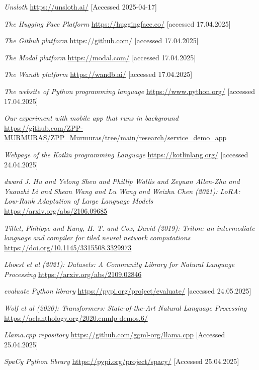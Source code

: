 \documentclass[licencjacka,en]{pracamgr}
\begin{document}
\begin{thebibliography}{99}
\textit{Unsloth}
\url{https://unsloth.ai/}
[Accessed 2025-04-17]

\textit{The Hugging Face Platform}
\url{https://huggingface.co/}
[accessed 17.04.2025]

\textit{The Github platform}
\url{https://github.com/}
[accessed 17.04.2025]

\textit{The Modal platform}
\url{https://modal.com/}
[accessed 17.04.2025]

\textit{The Wandb platform}
\url{https://wandb.ai/}
[accessed 17.04.2025]

\textit{The website of Python programming language}
\url{https://www.python.org/}
[accessed 17.04.2025]

\textit{Our experiment with mobile app that runs in background}
\url{https://github.com/ZPP-MURMURAS/ZPP_Murmuras/tree/main/research/service_demo_app}

\textit{Webpage of the Kotlin programming Language}
\url{https://kotlinlang.org/}
[accessed 24.04.2025]

\textit{dward J. Hu and Yelong Shen and Phillip Wallis and Zeyuan Allen-Zhu and Yuanzhi Li and Shean Wang and Lu Wang and Weizhu Chen (2021): LoRA: Low-Rank Adaptation of Large Language Models}
\url{https://arxiv.org/abs/2106.09685}

\textit{Tillet, Philippe and Kung, H. T. and Cox, David (2019): Triton: an intermediate language and compiler for tiled neural network computations}
\url{https://doi.org/10.1145/3315508.3329973}

\textit{Lhoest et al (2021): Datasets: A Community Library for Natural Language Processing}
\url{https://arxiv.org/abs/2109.02846}

\textit{evaluate Python library}
\url{https://pypi.org/project/evaluate/}
[accessed 24.05.2025]

\textit{Wolf et al (2020): Transformers: State-of-the-Art Natural Language Processing}
\url{https://aclanthology.org/2020.emnlp-demos.6/}

\textit{Llama.cpp repository}
\url{https://github.com/ggml-org/llama.cpp}
[Accessed 25.04.2025]

\textit{SpaCy Python library}
\url{https://pypi.org/project/spacy/}
[Accessed 25.04.2025]


\end{thebibliography}
\end{document}
